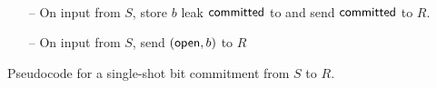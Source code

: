 \centering
\begin{bbox}[title={Functionality $\F_{\m{com}}(S, R)$}]
~
\begin{itemize}
\item[--] On input  from $S$, store $b$ leak $\mathsf{committed}$ to \A and send $\mathsf{committed}$ to $R$.
\item[--] On input  from $S$, send $(\mathsf{open}, b)$ to $R$
\end{itemize}
%
%
%
%
\end{bbox}
\caption{Pseudocode for a single-shot bit commitment from $S$ to $R$.}
\label{fig:fcomideal}
